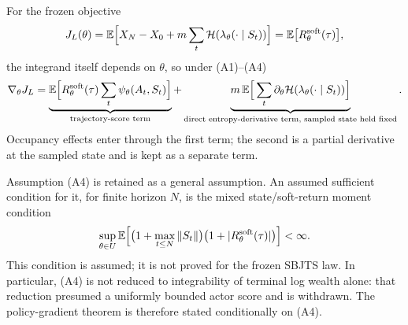 \documentclass[11pt]{article}
\newcommand{\E}{\mathbb E}
\begin{document}
For the frozen objective
\[
J_L(\theta)=\E\Big[X_N-X_0+m\sum_t \mathcal H(\lambda_\theta(\cdot\mid S_t))\Big]=\E\big[R^{\rm soft}_\theta(\tau)\big],
\]
the integrand itself depends on $\theta$, so under (A1)--(A4)
\[
\nabla_\theta J_L=\underbrace{\E\Big[R^{\rm soft}_\theta(\tau)\sum_t\psi_\theta(A_t,S_t)\Big]}_{\text{trajectory-score term}}+\underbrace{m\,\E\Big[\sum_t\partial_\theta \mathcal H(\lambda_\theta(\cdot\mid S_t))\Big]}_{\text{direct entropy-derivative term, sampled state held fixed}}.
\]
Occupancy effects enter through the first term; the second is a partial derivative at the sampled state and is kept as a separate term.

Assumption (A4) is retained as a general assumption. An assumed sufficient condition for it, for finite horizon $N$, is the mixed state/soft-return moment condition
\[
\sup_{\theta\in U}\E\Big[\big(1+\max_{t\le N}\|S_t\|\big)\big(1+|R^{\rm soft}_\theta(\tau)|\big)\Big]<\infty .
\]
This condition is assumed; it is not proved for the frozen SBJTS law. In particular, (A4) is not reduced to integrability of terminal log wealth alone: that reduction presumed a uniformly bounded actor score and is withdrawn. The policy-gradient theorem is therefore stated conditionally on (A4).
\end{document}
